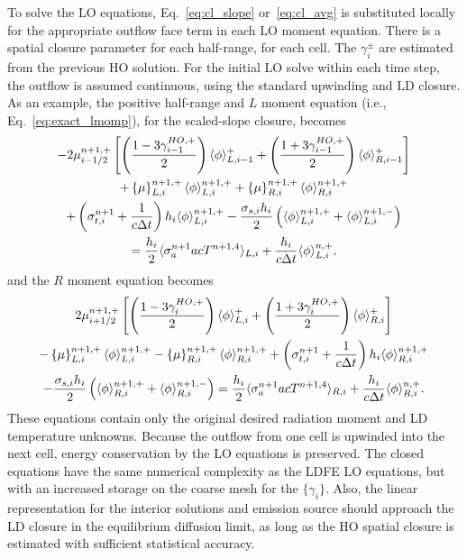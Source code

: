 To solve the LO equations, Eq.~\eqref{eq:cl_slope} or~\eqref{eq:cl_avg} is substituted
locally for
the appropriate outflow face term in each LO moment equation. There is a spatial closure parameter for each
half-range, for each cell.
 The $\gamma_i^\pm$ are
estimated from the previous HO solution. For the initial LO solve within each
time step, the outflow is assumed continuous, using the standard upwinding and LD closure.  
As an example, the positive half-range and $L$ moment equation (i.e.,
Eq.~\eqref{eq:exact_lmomp}), for the scaled-slope closure, becomes
\begin{multline}
    -2{\mu}_{i-1/2}^{n+1,+} \left[\left(\frac{\displaystyle 1 - 3 \gamma_{i-1}^{HO,+}}{\displaystyle 2 }  \right)
        \langle \phi \rangle_{L,i-1}^+ + \left(\frac{\displaystyle 1 + 3 \gamma_{i-1}^{HO,+}}{\displaystyle 2 }  \right)
    \langle \phi \rangle_{R,i-1}^+
    \right] \\ + \left\{ \mu \right\}_{L,i}^{n+1,+}
  \langle \phi \rangle_{L,i}^{n+1,+}
  +  \left\{ \mu \right\}_{R,i}^{n+1,+}
  \langle \phi \rangle_{R,i}^{n+1,+}\\ +  \left(\sigma_{t,i}^{n+1}+\frac{1}{c \Delta t} \right) h_i 
  \langle \phi \rangle_{L,i}^{n+1,+} -  \frac{\sigma_{s,i} h_i}{2} \left( \langle \phi \rangle_{L,i}^{n+1,+} +
  \langle \phi \rangle_{L,i}^{n+1,-}\right)\\  = \frac{h_i}{2} \langle \sigma_a^{n+1} a c T^{n+1,4} \rangle_{L,i} +
  \frac{h_i}{c\Delta t}\langle \phi \rangle_{L,i}^{n,+},
    \label{eqn:clsd_posl}
\end{multline}
and the $R$ moment equation becomes
\begin{multline}
    2{\mu}_{i+1/2}^{n+1,+} \left[
    \left(\frac{\displaystyle 1 - 3 \gamma_{i}^{HO,+}}{\displaystyle 2 }  \right)
        \langle \phi \rangle_{L,i}^+ + \left(\frac{\displaystyle 1 + 3 \gamma_{i}^{HO,+}}{\displaystyle 2 }  \right)
    \langle \phi \rangle_{R,i}^+
    \right]  \\ 
    - \left\{ \mu \right\}_{L,i}^{n+1,+}
  \langle \phi \rangle_{L,i}^{n+1,+}
  -  \left\{ \mu \right\}_{R,i}^{n+1,+}
  \langle \phi \rangle_{R,i}^{n+1,+} +  \left(\sigma_{t,i}^{n+1}+\frac{1}{c \Delta t} \right) h_i 
  \langle \phi \rangle_{R,i}^{n+1,+} \\-  \frac{\sigma_{s,i} h_i}{2} \left( \langle \phi \rangle_{R,i}^{n+1,+} +
  \langle \phi \rangle_{R,i}^{n+1,-}\right) = \frac{h_i}{2} \langle \sigma_a^{n+1} a c T^{n+1,4} \rangle_{R,i} +
  \frac{h_i}{c\Delta t}\langle \phi \rangle_{R,i}^{n,+}.
    \label{eqn:clsd_posr}
\end{multline}
These equations contain only the original desired radiation moment and LD temperature unknowns.
Because the
outflow from one cell is upwinded into the next cell, energy conservation by the LO
equations is preserved.
The closed equations have the
same numerical complexity as the LDFE LO equations, but with an increased storage on the
coarse mesh for the
$\{\gamma_i\}$.  Also, the linear representation for the interior
solutions and emission source should approach the LD closure in the equilibrium diffusion limit, as long
as the HO spatial closure is estimated with sufficient statistical accuracy.  

